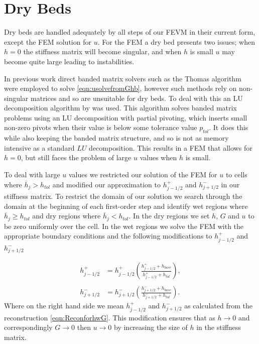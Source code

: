\section{Dry Beds}



Dry beds are handled adequately by all steps of our FEVM in their current form, except the FEM solution for $u$. For the FEM a dry bed presents two issues; when $h=0$ the stiffness matrix will become singular, and when $h$ is small $u$ may become quite large leading to instabilities. 

In previous work \cite{Zoppou-etal-2017} direct banded matrix solvers such as the Thomas algorithm were employed to solve \eqref{eqn:usolvefromGhb}, however such methods rely on non-singular matrices and so are unsuitable for dry beds. To deal with this an LU decomposition algorithm by \citet{NumRecC-1996} was used. This algorithm solves banded matrix problems using an LU decomposition with partial pivoting, which inserts small non-zero pivots when their value is below some tolerance value $p_{tol}$. It does this while also keeping the banded matrix structure, and so is not as memory intensive as a standard $LU$ decomposition. This results in a FEM that allows for $h=0$, but still faces the problem of large $u$ values when $h$ is small. 

To deal with large $u$ values we restricted our solution of the FEM for $u$ to cells where $\overline{h}_j> h_{tol}$ and modified our approximation to $h^+_{j-1/2}$ and $h^-_{j+1/2}$ in our stiffness matrix. To restrict the domain of our solution we search through the domain at the beginning of each first-order step and identify  wet regions where $\overline{h}_j \ge h_{tol}$ and dry regions where $\overline{h}_j < h_{tol}$. In the dry regions we set $h$, $G$ and $u$ to be zero uniformly over the cell. In the wet regions we solve the FEM with the appropriate boundary conditions and the following modifications to $h^+_{j-1/2}$ and $h^-_{j+1/2}$

\begin{subequations}
\begin{align}
h^+_{j-1/2} & = h^+_{j-1/2} \left(\frac{ h^+_{j-1/2}  + h_{base}}{h^+_{j-1/2} + h_{tol}}\right) , \\ \nonumber\\
h^-_{j+1/2} & = h^-_{j+1/2} \left(\frac{ h^-_{j+1/2}  + h_{base}}{h^-_{j+1/2} + h_{tol}}\right).
\end{align} 
\end{subequations}
Where on the right hand side we mean $h^+_{j-1/2}$ and $h^-_{j+1/2}$ as calculated from the reconstruction \eqref{eqn:ReconforhwG}. This modification ensures that as $h \rightarrow 0$ and correspondingly $G\rightarrow 0 $ then $u \rightarrow 0$ by increasing the size of $h$ in the stiffness matrix. 

